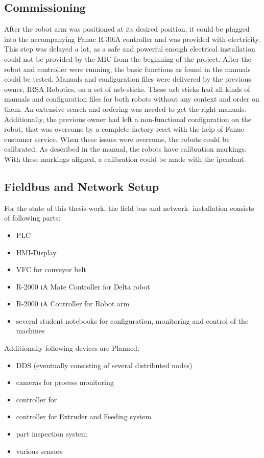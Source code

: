 \subsection{Commissioning}
After the robot arm was positioned at its desired position, it could be plugged into the accompanying Fanuc R-30iA controller and was provided with electricity. 
This step was delayed a lot, as a safe and powerful enough electrical installation could not be provided by the \ac{MIC} from the beginning of the project.
After the robot and controller were running, the basic functions as found in the manuals could be tested. 
Manuals and configuration files were delivered by the previous owner, IRSA Robotics, on a set of \ac{usb}-sticks. 
These \ac{usb} sticks had all kinds of manuals and configuration files for both robots without any context and order on them. 
An extensive search and ordering was needed to get the right manuals.
Additionally, the previous owner had left a non-functional configuration on the robot, that was overcome by a complete factory reset with the help of Fanuc customer service.
When these issues were overcome, the robots could be calibrated. As described in the manual, the robots have calibration markings. With these markings aligned, a calibration could be made with the \gls{ipendant}.




\subsection{Fieldbus and Network Setup}

For the state of this thesis-work, the field bus and network- installation consists of following parts:
\begin{itemize}
	\item \ac{PLC}
	\item \ac{HMI}-Display
	\item \ac{VFC} for conveyor belt
	\item R-2000 iA Mate Controller for Delta robot
	\item R-2000 iA Controller for Robot arm
	\item several student notebooks for configuration, monitoring and control of the machines
\end{itemize}

Additionally following devices are Planned:
\begin{itemize}
	\item \ac{DDS} (eventually consisting of several distributed nodes)
	\item cameras for process monitoring 
	\item controller for 
	\item controller for Extruder and Feeding system
	\item part inspection system
	\item various sensors
\end{itemize}

